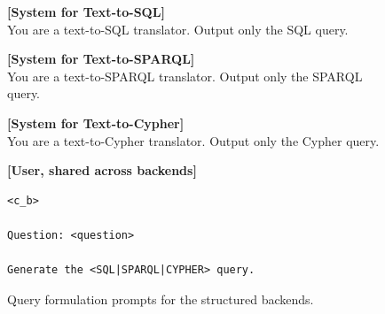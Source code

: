 \begin{figure}
\centering
\begin{promptbox}
\textbf{[System for Text-to-SQL]}\\[2pt]
You are a text-to-SQL translator. Output only the SQL query.

\textbf{[System for Text-to-SPARQL]}\\[2pt]
You are a text-to-SPARQL translator. Output only the SPARQL query.

\textbf{[System for Text-to-Cypher]}\\[2pt]
You are a text-to-Cypher translator. Output only the Cypher query.

\tcbline

\textbf{[User, shared across backends]}\\[2pt]
\begin{verbatim}
<c_b>

Question: <question>

Generate the <SQL|SPARQL|CYPHER> query.
\end{verbatim}
\end{promptbox}
\caption{Query formulation prompts for the structured backends.}
\label{fig:query_formulation_prompt}
\end{figure}
